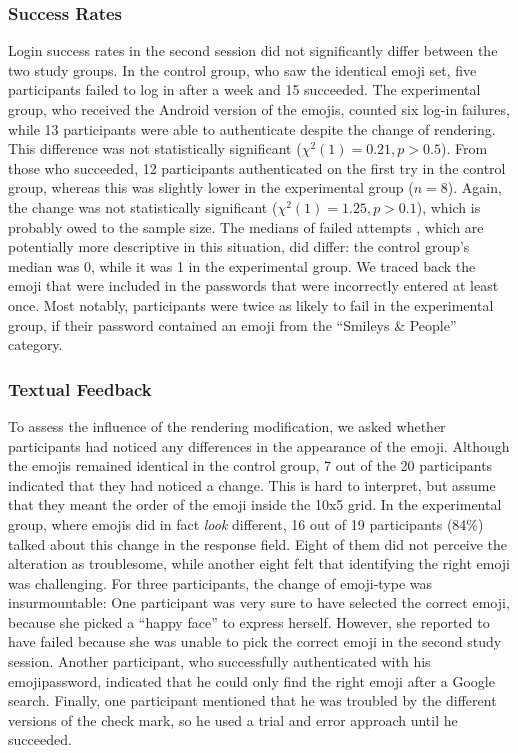 \subsubsection{Success Rates}
Login success rates in the second session did not significantly differ between the two study groups. In the control group, who saw the identical emoji set, five participants failed to log in after a week and 15 succeeded. The experimental group, who received the Android version of the emojis, counted six log-in failures, while 13 participants were able to authenticate despite the change of rendering. This difference was not statistically significant ($\chi^2(1)=0.21, p>0.5$). From those who succeeded, 12 participants authenticated on the first try in the control group, whereas this was slightly lower in the experimental group ($n=8$). Again, the change was not statistically significant ($\chi^2(1)=1.25, p>0.1$), which is probably owed to the sample size. The medians of failed attempts , which are potentially more descriptive in this situation, did differ: the control group's median was 0, while it was 1 in the experimental group. We traced back the emoji that were included in the passwords that were incorrectly entered at least once. Most notably, participants were twice as likely to fail in the experimental group, if their password contained an emoji from the ``Smileys \& People'' category. 

\subsubsection{Textual Feedback}
To assess the influence of the rendering modification, we asked whether participants had noticed any differences in the appearance of the emoji. Although the emojis remained identical in the control group, 7 out of the 20 participants indicated that they had noticed a change. This is hard to interpret, but assume that they meant the order of the emoji inside the 10x5 grid. In the experimental group, where emojis did in fact \textit{look} different, 16 out of 19 participants (84\%) talked about this change in the response field. Eight of them did not perceive the alteration as troublesome, while another eight felt that identifying the right emoji was challenging. For three participants, the change of emoji-type was insurmountable: One participant was very sure to have selected the correct emoji, because she picked a ``happy face'' to express herself. However, she reported to have failed because she was unable to pick the correct emoji in the second study session. Another participant, who successfully authenticated with his emojipassword, indicated that he could only find the right emoji after a Google search. Finally, one participant mentioned that he was troubled by the different versions of the check mark, so he used a trial and error approach until he succeeded.


